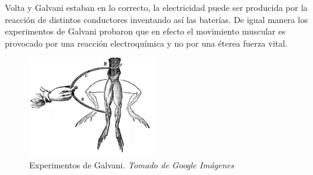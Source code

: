 \documentclass[journal]{IEEEtran}
\begin{document}
Volta y Galvani estaban en lo correcto, la electricidad puede ser producida por la reacción de distintos conductores inventando así las baterías. De igual manera
los experimentos de Galvani probaron que en efecto el movimiento muscular es provocado por una reacción electroquímica y no por una éterea fuerza vital.\cite{johnson_2014}

\begin{center}
  \begin{figure}[h!]
  \includegraphics[width=55mm]{frogs.png}
  \caption{Experimentos de Galvani. \emph{Tomado de Google Imágenes}}
  \end{figure}
\end{center}






%
\end{document}
